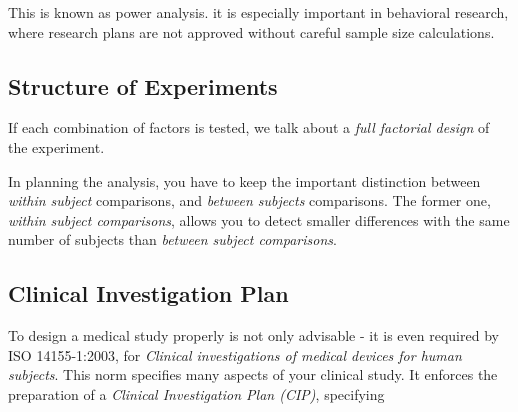 This is known as \gls{power analysis}. it is especially important in behavioral research, where research plans are not approved without careful sample size calculations.

\subsection{Structure of Experiments}

If each combination of factors is tested, we talk about a \emph{full factorial design} of the experiment.

In planning the analysis, you have to keep the important distinction between \emph{within subject} comparisons, and \emph{between subjects} comparisons. The former one, \emph{within subject comparisons}, allows you to detect smaller differences with the same number of subjects than \emph{between subject comparisons}.

\subsection{Clinical Investigation Plan}

To design a medical study properly is not only advisable - it is even required by ISO 14155-1:2003, for \emph{Clinical investigations of medical devices for human subjects}. This norm specifies many aspects of your clinical study. It enforces the preparation of a \emph{Clinical Investigation Plan (CIP)}, specifying

